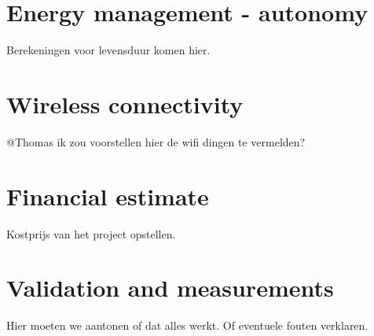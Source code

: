 \documentclass[11pt,a4paper]{article}
\begin{document}
\section{Energy management - autonomy}
Berekeningen voor levensduur komen hier.

\section{Wireless connectivity}
@Thomas ik zou voorstellen hier de wifi dingen te vermelden?

\section{Financial estimate}
Kostprijs van het project opstellen.

\section{Validation and measurements}
Hier moeten we aantonen of dat alles werkt. Of eventuele fouten verklaren.
\end{document}
